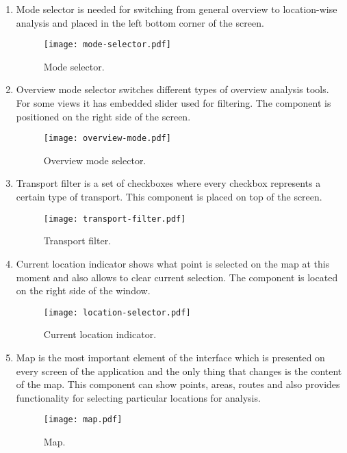 \begin{enumerate}
  \item Mode selector is needed for switching from general overview to location-wise analysis and
  placed in the left bottom corner of the screen.

  \begin{figure}[ht]
    \centering
    \texttt{[image: mode-selector.pdf]}
    \caption{Mode selector.}
    \label{pic:mode_selector}
  \end{figure}

  \item Overview mode selector switches different types of overview analysis tools. For some
  views it has embedded slider used for filtering. The component is positioned on the right
  side of the screen.

  \begin{figure}[ht]
    \centering
    \texttt{[image: overview-mode.pdf]}
    \caption{Overview mode selector.}
    \label{pic:overview_selector}
  \end{figure}

  \item Transport filter is a set of checkboxes where every checkbox represents a certain
  type of transport. This component is placed on top of the screen.

  \begin{figure}[ht]
    \centering
    \texttt{[image: transport-filter.pdf]}
    \caption{Transport filter.}
    \label{pic:transport_filter}
  \end{figure}

  \item Current location indicator shows what point is selected on the map at this moment and
  also allows to clear current selection. The component is located on the right side of the window.

  \begin{figure}[ht]
    \centering
    \texttt{[image: location-selector.pdf]}
    \caption{Current location indicator.}
    \label{pic:location_selector}
  \end{figure}

  \item Map is the most important element of the interface which is presented on every screen
  of the application and the only thing that changes is the content of the map.
  This component can show points, areas, routes and also provides functionality for
  selecting particular locations for analysis.

  \begin{figure}[ht]
    \centering
    \texttt{[image: map.pdf]}
    \caption{Map.}
    \label{pic:map}
  \end{figure}

\end{enumerate}

